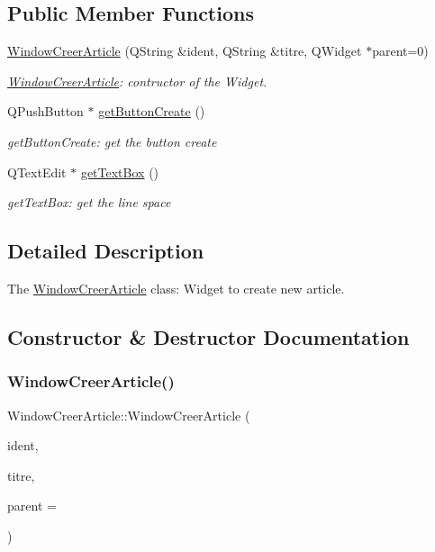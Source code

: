 \subsection*{Public Member Functions}
\begin{DoxyCompactItemize}
\item 
\hyperlink{class_window_creer_article_a671c555bd8bbfbe756c083564487d060}{Window\+Creer\+Article} (Q\+String \&ident, Q\+String \&titre, Q\+Widget $\ast$parent=0)
\begin{DoxyCompactList}\small\item\em \hyperlink{class_window_creer_article}{Window\+Creer\+Article}\+: contructor of the Widget. \end{DoxyCompactList}\item 
Q\+Push\+Button $\ast$ \hyperlink{class_window_creer_article_a9ad8fafa868025bf32085515d5c32f10}{get\+Button\+Create} ()
\begin{DoxyCompactList}\small\item\em get\+Button\+Create\+: get the button create \end{DoxyCompactList}\item 
Q\+Text\+Edit $\ast$ \hyperlink{class_window_creer_article_a3360676f4cc24185a3af311353c3c356}{get\+Text\+Box} ()
\begin{DoxyCompactList}\small\item\em get\+Text\+Box\+: get the line space \end{DoxyCompactList}\end{DoxyCompactItemize}


\subsection{Detailed Description}
The \hyperlink{class_window_creer_article}{Window\+Creer\+Article} class\+: Widget to create new article. 

\subsection{Constructor \& Destructor Documentation}
\mbox{\label{class_window_creer_article_a671c555bd8bbfbe756c083564487d060}} 
\subsubsection{\texorpdfstring{Window\+Creer\+Article()}{WindowCreerArticle()}}
{\footnotesize\ttfamily Window\+Creer\+Article\+::\+Window\+Creer\+Article (\begin{DoxyParamCaption}\item[{Q\+String \&}]{ident,  }\item[{Q\+String \&}]{titre,  }\item[{Q\+Widget $\ast$}]{parent = {} }\end{DoxyParamCaption})}



